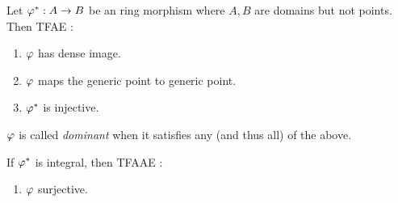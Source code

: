 \documentclass[./main.tex]{subfiles}
\begin{document}
\begin{prop}
  
  Let $\varphi^* : A \to B$ be an ring morphism 
  where $A, B$ are domains but not points. 
  Then TFAE : 
  \begin{enumerate}
    \item $\varphi$ has dense image. 
    \item $\varphi$ maps the generic point to generic point. 
    \item $\varphi^*$ is injective. 
  \end{enumerate}
  $\varphi$ is called \emph{dominant} when 
  it satisfies any (and thus all) of the above. 

  If $\varphi^*$ is integral, then TFAAE : 
  \begin{enumerate}[resume]
    \item $\varphi$ surjective. 
  \end{enumerate}

\end{prop}
\end{document}
